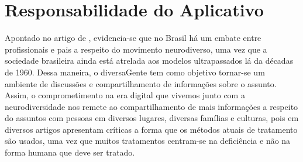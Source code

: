 \section{Responsabilidade do Aplicativo}
Apontado no artigo de \cite{rios}, evidencia-se que no Brasil há um embate entre profissionais e pais a respeito do movimento neurodiverso, uma vez que a sociedade brasileira ainda está atrelada aos modelos ultrapassados lá da décadas de 1960. Dessa maneira, o diversaGente tem como objetivo tornar-se um ambiente de discussões e compartilhamento de informações sobre o assunto. Assim, o comprometimento na era digital que vivemos junto com a neurodiversidade nos remete ao compartilhamento de mais informações a respeito do assuntos com pessoas em diversos lugares, diversas famílias e culturas, pois em diversos artigos apresentam críticas a forma que os métodos atuais de tratamento são usados, uma vez que muitos tratamentos centram-se na deficiência e não na forma humana que deve ser tratado\cite{machado}. 


